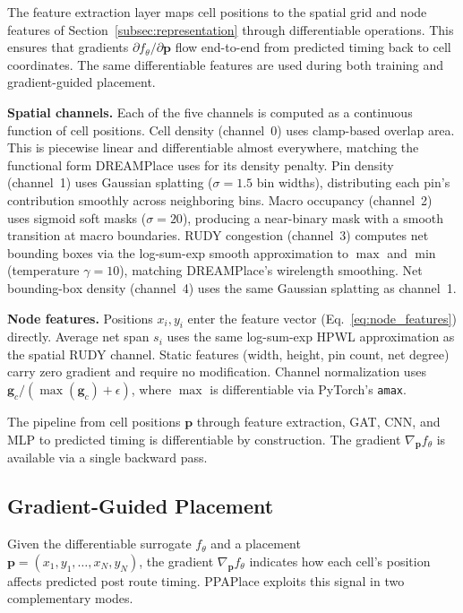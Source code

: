 \documentclass[sigconf,anonymous,review,9pt]{acmart}
\begin{document}
The feature extraction layer maps cell positions to the spatial grid
and node features of Section~\ref{subsec:representation} through
differentiable operations. This ensures that gradients
$\partial f_\theta / \partial \mathbf{p}$ flow end-to-end from
predicted timing back to cell coordinates. The same differentiable
features are used during both training and gradient-guided placement.

\textbf{Spatial channels.} Each of the five channels is computed as a
continuous function of cell positions. Cell density (channel~0) uses
clamp-based overlap area. This is piecewise linear and differentiable
almost everywhere, matching the functional form DREAMPlace uses for
its density penalty. Pin density (channel~1) uses Gaussian splatting
($\sigma = 1.5$ bin widths), distributing each pin's contribution
smoothly across neighboring bins. Macro occupancy (channel~2) uses
sigmoid soft masks ($\sigma = 20$), producing a near-binary mask with
a smooth transition at macro boundaries. RUDY congestion (channel~3)
computes net bounding boxes via the log-sum-exp smooth approximation
to $\max$ and $\min$ (temperature $\gamma = 10$), matching
DREAMPlace's wirelength smoothing. Net bounding-box density
(channel~4) uses the same Gaussian splatting as channel~1.

\textbf{Node features.} Positions $x_i, y_i$ enter the feature vector
(Eq.~\ref{eq:node_features}) directly. Average net span $s_i$ uses
the same log-sum-exp HPWL approximation as the spatial RUDY channel.
Static features (width, height, pin count, net degree) carry zero
gradient and require no modification. Channel normalization uses
$\mathbf{g}_c / (\max(\mathbf{g}_c) + \epsilon)$, where $\max$ is
differentiable via PyTorch's \texttt{amax}.

The pipeline from cell positions $\mathbf{p}$ through feature
extraction, GAT, CNN, and MLP to predicted timing is differentiable by
construction. The gradient
$\nabla_{\mathbf{p}} f_\theta$ is available via a single backward
pass.


\subsection{Gradient-Guided Placement}
\label{subsec:gradient_placement}

Given the differentiable surrogate $f_\theta$ and a placement \\
$\mathbf{p} = (x_1, y_1, \ldots, x_N, y_N)$, the gradient
$\nabla_{\mathbf{p}} f_\theta$ indicates how each cell's position
affects predicted post route timing. PPAPlace exploits this signal in two
complementary modes.
\end{document}
